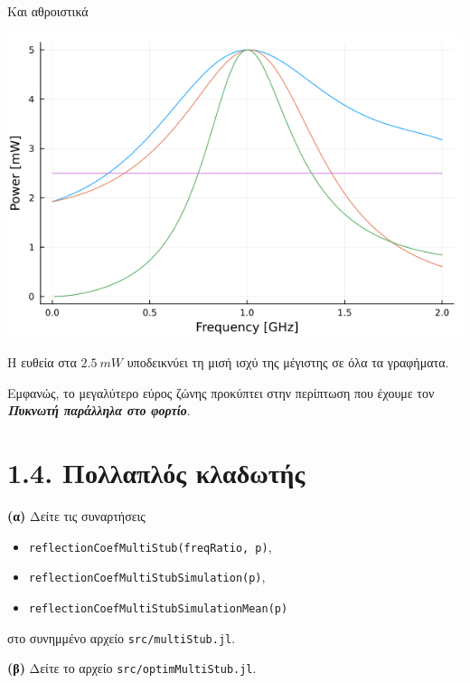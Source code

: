 \documentclass[12pt]{article}
\begin{document}
Και αθροιστικά 
\begin{center}
    \includegraphics*[scale=0.6]{1-3-c_all.png}
\end{center} 

Η ευθεία στα \(\SI{2.5}{mW}\) υποδεικνύει τη μισή ισχύ της μέγιστης σε όλα τα γραφήματα.

Εμφανώς, το μεγαλύτερο εύρος ζώνης προκύπτει στην περίπτωση που έχουμε τον \textbf{\textit{Πυκνωτή παράλληλα στο φορτίο}}.

\newpage
\section*{1.4. Πολλαπλός κλαδωτής}
\textbf{(α)} Δείτε τις συναρτήσεις 
\begin{itemize}
    \item \texttt{reflectionCoefMultiStub(freqRatio, p)},
    \item \texttt{reflectionCoefMultiStubSimulation(p)},
    \item \texttt{reflectionCoefMultiStubSimulationMean(p)}
\end{itemize}
στο συνημμένο αρχείο \texttt{src/multiStub.jl}. 

\bigskip
\textbf{(β)} Δείτε το αρχείο \texttt{src/optimMultiStub.jl}.
\end{document}
